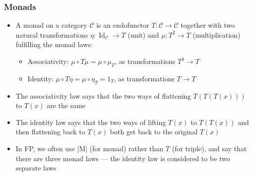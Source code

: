 \documentclass[mathserif,handout]{beamer}
\begin{document}
\begin{frame}[fragile]
  \frametitle{Monads}
  \begin{itemize}
  \item A \alert{monad} on a category $\mathcal{C}$ is an endofunctor $T: \mathcal{C}\longrightarrow\mathcal{C}$ together with two natural transformations $\eta: \operatorname{Id}_\mathcal{C} \longrightarrow T$ (\alert{unit}) and $\mu: T^2\longrightarrow T$ (\alert{multiplication}) fulfilling the \alert{monad laws}:
    \begin{itemize}
    \item \alert{Associativity}: $\mu \circ T\mu = \mu \circ \mu_T$, as transformations $T^3\longrightarrow T$
      \item \alert{Identity}: $\mu \circ T\eta = \mu\circ \eta_T = 1_T$, as transformations $T\longrightarrow T$
    \end{itemize}
  \item The associativity law says that the two ways of \alert{flattening} $T(T(T(x)))$ to $T(x)$ are the same
  \item The identity law says that the two ways of \alert{lifting} $T(x)$ to $T(T(x))$ and then flattening back to $T(x)$ both get back to the original $T(x)$
    \item In FP, we often use |M| (for monad) rather than $T$ (for triple), and say that there are three monad laws --- the identity law is considered to be two separate laws
  \end{itemize}
\end{frame}

\end{document}
